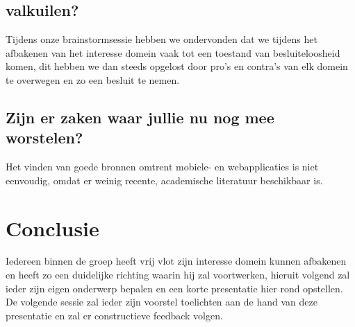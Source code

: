 \documentclass[fleqn,10pt]{voorstel}
\begin{document}
\subsection{valkuilen?}
Tijdens onze brainstormsessie hebben we ondervonden dat we tijdens het afbakenen van het interesse domein vaak tot een toestand van besluiteloosheid komen, dit hebben we dan steeds opgelost door pro's en contra's van elk domein te overwegen en zo een besluit te nemen. 
\subsection{Zijn er zaken waar jullie nu nog mee worstelen?}
Het vinden van goede bronnen omtrent mobiele- en webapplicaties is niet eenvoudig, omdat er weinig recente, academische literatuur beschikbaar is. 

\section{Conclusie}
Iedereen binnen de groep heeft vrij vlot zijn interesse domein kunnen afbakenen en heeft zo een duidelijke richting waarin hij zal voortwerken, hieruit volgend zal ieder zijn eigen onderwerp bepalen en een korte presentatie hier rond opstellen. De volgende sessie zal ieder zijn voorstel toelichten aan de hand van deze presentatie en zal er constructieve feedback volgen.




\end{document}

